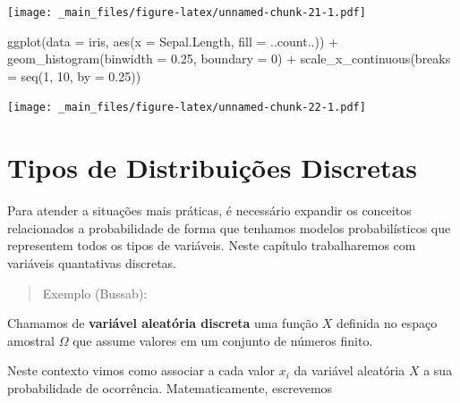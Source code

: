 \documentclass[
]{book}
\newenvironment{Shaded}{\begin{snugshade}}{\end{snugshade}}
\newcommand{\AttributeTok}[1]{\textcolor[rgb]{0.77,0.63,0.00}{#1}}
\newcommand{\DecValTok}[1]{\textcolor[rgb]{0.00,0.00,0.81}{#1}}
\newcommand{\FloatTok}[1]{\textcolor[rgb]{0.00,0.00,0.81}{#1}}
\newcommand{\FunctionTok}[1]{\textcolor[rgb]{0.00,0.00,0.00}{#1}}
\newcommand{\NormalTok}[1]{#1}
\newcommand{\SpecialCharTok}[1]{\textcolor[rgb]{0.00,0.00,0.00}{#1}}
\begin{document}
\begin{Shaded}
\end{Shaded}

\texttt{[image: \_main\_files/figure-latex/unnamed-chunk-21-1.pdf]}

\begin{Shaded}
\begin{Highlighting}[]
\FunctionTok{ggplot}\NormalTok{(}\AttributeTok{data =}\NormalTok{ iris, }\FunctionTok{aes}\NormalTok{(}\AttributeTok{x =}\NormalTok{ Sepal.Length, }\AttributeTok{fill =}\NormalTok{ ..count..)) }\SpecialCharTok{+}
  \FunctionTok{geom\_histogram}\NormalTok{(}\AttributeTok{binwidth =} \FloatTok{0.25}\NormalTok{, }\AttributeTok{boundary =} \DecValTok{0}\NormalTok{) }\SpecialCharTok{+}
  \FunctionTok{scale\_x\_continuous}\NormalTok{(}\AttributeTok{breaks =} \FunctionTok{seq}\NormalTok{(}\DecValTok{1}\NormalTok{, }\DecValTok{10}\NormalTok{, }\AttributeTok{by =} \FloatTok{0.25}\NormalTok{)) }
\end{Highlighting}
\end{Shaded}

\texttt{[image: \_main\_files/figure-latex/unnamed-chunk-22-1.pdf]}

\hypertarget{tipos-de-distribuiuxe7uxf5es-discretas}{%
\chapter{Tipos de Distribuições Discretas}\label{tipos-de-distribuiuxe7uxf5es-discretas}}

Para atender a situações mais práticas, é necessário expandir os conceitos relacionados a probabilidade de forma que tenhamos modelos probabilísticos que representem todos os tipos de variáveis. Neste capítulo trabalharemos com variáveis quantativas discretas.

\begin{quote}
Exemplo (Bussab):
\end{quote}

Chamamos de \textbf{variável aleatória discreta} uma função \(X\) definida no espaço amostral \(\Omega\) que assume valores em um conjunto de números finito.

Neste contexto vimos como associar a cada valor \(x_i\) da variável aleatória \(X\) a sua probabilidade de ocorrência. Matematicamente, escrevemos
\end{document}
